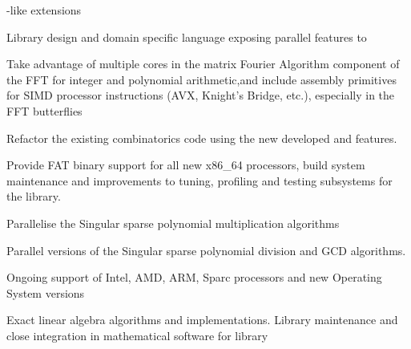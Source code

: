 \begin{workpackage}
\begin{wpdelivs}
\begin{wpdeliv}[due=18,id=GAP-hpc-report,dissem=PU,nature=R,lead=SA]
{      \Cython-like extensions }
  \end{wpdeliv}
  \begin{wpdeliv}[due=24,id=LinBox-DSL,dissem=PU,nature=R,lead=UJF]
    {Library design and domain specific language exposing \Linbox parallel features to \Sage}
  \end{wpdeliv}
  \begin{wpdeliv}[due=24,id=FFT,dissem=PU,nature=DEM, lead=UK]
    {Take advantage of multiple cores in the matrix Fourier Algorithm component of the FFT
      for integer and polynomial arithmetic,and include assembly primitives for SIMD
      processor instructions (AVX, Knight's Bridge, etc.), especially in the FFT
      butterflies}
\end{wpdeliv}
  \begin{wpdeliv}[due=24,id=HPCcombi,dissem=PU,nature=DEM,lead=LL]
      {Refactor the existing combinatorics \Sage code using the new developed \Pythran and \Cython features.}
  \end{wpdeliv}
  \begin{wpdeliv}[due=24,id=MPIRfat,dissem=PU,nature=DEM,lead=UK]
      {Provide FAT binary support for all new x86\_64 processors, build system
        maintenance and improvements to tuning, profiling and testing subsystems
      for the \MPIR library.}
\end{wpdeliv}
  \begin{wpdeliv}[due=36,id=singular-polymul,dissem=PU,nature=DEM,lead=UK]
      {Parallelise the Singular sparse polynomial multiplication algorithms}
\end{wpdeliv}
  \begin{wpdeliv}[due=48,id=singular-polyarith,dissem=PU,nature=DEM, lead=UK]
      {Parallel versions of the Singular sparse polynomial division and GCD algorithms.}
\end{wpdeliv}
  \begin{wpdeliv}[due=48,id=MPIRprocessors,dissem=PU,nature=DEM,lead=UK]
      {Ongoing support of Intel, AMD, ARM, Sparc processors and new Operating System versions}
  \end{wpdeliv}
  \begin{wpdeliv}[due=36,id=LinBox-algo,dissem=PU,nature=DEM, lead=UJF]
    {Exact linear algebra algorithms and implementations. Library maintenance and close integration
      in mathematical software for \Linbox library}
  \end{wpdeliv}
  \begin{wpdeliv}[due=47,id=GAP-software-final,dissem=PU,nature=OTHER,lead=SA]

\end{wpdeliv}
\end{wpdelivs}
\end{workpackage}
